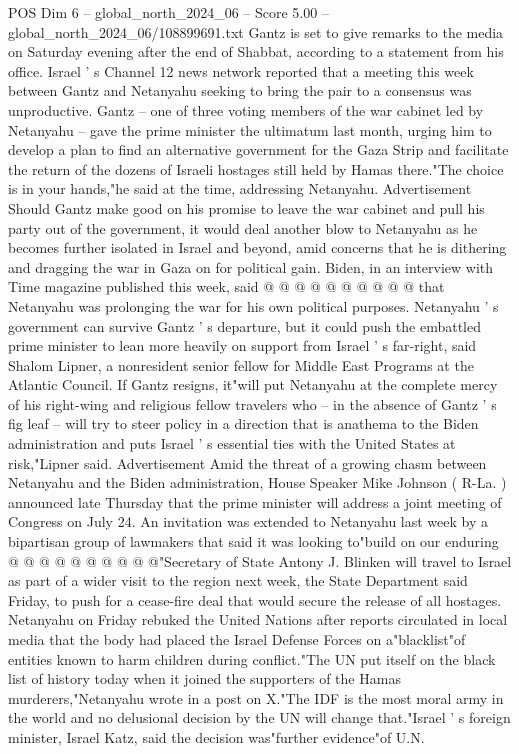 \begin{textsample}{POS Dim 6 – global\_north\_2024\_06 – Score 5.00 – global\_north\_2024\_06/108899691.txt}  \label{ex:f6_pos_150}
Gantz is set to give remarks to the media on Saturday evening after the end of Shabbat, according to a statement from his office.
Israel ' s Channel 12 news network reported that a meeting this week between Gantz and Netanyahu seeking to bring the pair to a consensus was unproductive.
Gantz -- one of three voting members of the war cabinet led by Netanyahu -- gave the prime minister the ultimatum last month, urging him to develop a plan to find an alternative government for the Gaza Strip and facilitate the return of the dozens of Israeli hostages still held by Hamas there."The choice is in your hands,"he said at the time, addressing Netanyahu.
Advertisement Should Gantz make good on his promise to leave the war cabinet and pull his party out of the government, it would deal another blow to Netanyahu as he becomes further isolated in Israel and beyond, amid concerns that he is dithering and dragging the war in Gaza on for political gain.
Biden, in an interview with Time magazine published this week, said @ @ @ @ @ @ @ @ @ @ that Netanyahu was prolonging the war for his own political purposes.
Netanyahu ' s government can survive Gantz ' s departure, but it could push the embattled prime minister to lean more heavily on support from Israel ' s far-right, said Shalom Lipner, a nonresident senior fellow for Middle East Programs at the Atlantic Council.
If Gantz resigns, it"will put Netanyahu at the complete mercy of his right-wing and religious fellow travelers who -- in the absence of Gantz ' s fig leaf -- will try to steer policy in a direction that is anathema to the Biden administration and puts Israel ' s essential ties with the United States at risk,"Lipner said.
Advertisement Amid the threat of a growing chasm between Netanyahu and the Biden administration, House Speaker Mike Johnson ( R-La. ) announced late Thursday that the prime minister will address a joint meeting of Congress on July 24.
An invitation was extended to Netanyahu last week by a bipartisan group of lawmakers that said it was looking to"build on our enduring @ @ @ @ @ @ @ @ @ @"Secretary of State Antony J.
Blinken will travel to Israel as part of a wider visit to the region next week, the State Department said Friday, to push for a cease-fire deal that would secure the release of all hostages.
Netanyahu on Friday rebuked the United Nations after reports circulated in local media that the body had placed the Israel Defense Forces on a"blacklist"of entities known to harm children during conflict."The UN put itself on the black list of history today when it joined the supporters of the Hamas murderers,"Netanyahu wrote in a post on X."The IDF is the most moral army in the world and no delusional decision by the UN will change that."Israel ' s foreign minister, Israel Katz, said the decision was"further evidence"of U.N.

\end{textsample}
